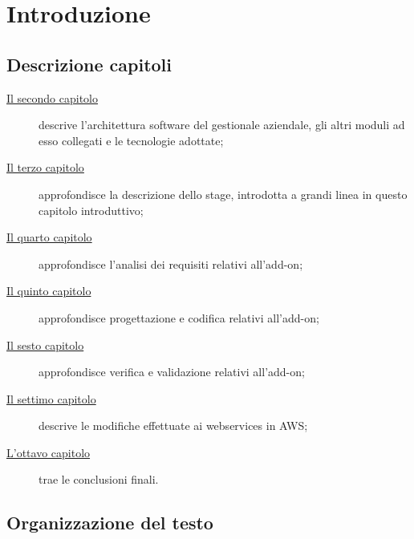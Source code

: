 
\chapter{Introduzione}
\label{cap:introduzione}

\section{Descrizione capitoli}
\begin{description}
	\item[{\hyperref[cap:processi-metodologie]{Il secondo capitolo}}] descrive l'architettura software del gestionale aziendale, gli altri moduli ad esso collegati e le tecnologie adottate;
	
	\item[{\hyperref[cap:descrizione-stage]{Il terzo capitolo}}] approfondisce la descrizione dello stage, introdotta a grandi linea in questo capitolo introduttivo;
	
	\item[{\hyperref[cap:analisi-requisiti]{Il quarto capitolo}}] approfondisce l'analisi dei requisiti relativi all'add-on;
	
	\item[{\hyperref[cap:progettazione-codifica]{Il quinto capitolo}}] approfondisce progettazione e codifica relativi all'add-on;
	
	\item[{\hyperref[cap:verifica-validazione]{Il sesto capitolo}}] approfondisce verifica e validazione relativi all'add-on;
	
	\item[{\hyperref[cap:webservices]{Il settimo capitolo}}] descrive le modifiche effettuate ai webservices in AWS;
	\item[{\hyperref[cap:conclusioni]{L'ottavo capitolo}}] trae le conclusioni finali.
\end{description}
\section{Organizzazione del testo}

